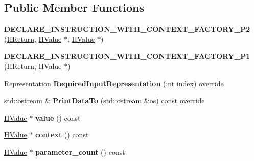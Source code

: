 \subsection*{Public Member Functions}
\begin{DoxyCompactItemize}
\item 
{\bfseries D\+E\+C\+L\+A\+R\+E\+\_\+\+I\+N\+S\+T\+R\+U\+C\+T\+I\+O\+N\+\_\+\+W\+I\+T\+H\+\_\+\+C\+O\+N\+T\+E\+X\+T\+\_\+\+F\+A\+C\+T\+O\+R\+Y\+\_\+\+P2} (\hyperlink{classv8_1_1internal_1_1_h_return}{H\+Return}, \hyperlink{classv8_1_1internal_1_1_h_value}{H\+Value} $\ast$, \hyperlink{classv8_1_1internal_1_1_h_value}{H\+Value} $\ast$)\hypertarget{classv8_1_1internal_1_1_h_return_a0787f2353cdb06f024296ce12d490cdd}{}\label{classv8_1_1internal_1_1_h_return_a0787f2353cdb06f024296ce12d490cdd}

\item 
{\bfseries D\+E\+C\+L\+A\+R\+E\+\_\+\+I\+N\+S\+T\+R\+U\+C\+T\+I\+O\+N\+\_\+\+W\+I\+T\+H\+\_\+\+C\+O\+N\+T\+E\+X\+T\+\_\+\+F\+A\+C\+T\+O\+R\+Y\+\_\+\+P1} (\hyperlink{classv8_1_1internal_1_1_h_return}{H\+Return}, \hyperlink{classv8_1_1internal_1_1_h_value}{H\+Value} $\ast$)\hypertarget{classv8_1_1internal_1_1_h_return_a9df89c1e02c5b2e1d4d44464c4633dcf}{}\label{classv8_1_1internal_1_1_h_return_a9df89c1e02c5b2e1d4d44464c4633dcf}

\item 
\hyperlink{classv8_1_1internal_1_1_representation}{Representation} {\bfseries Required\+Input\+Representation} (int index) override\hypertarget{classv8_1_1internal_1_1_h_return_a665b06af7dc4ff9c04e861908a14ae1f}{}\label{classv8_1_1internal_1_1_h_return_a665b06af7dc4ff9c04e861908a14ae1f}

\item 
std\+::ostream \& {\bfseries Print\+Data\+To} (std\+::ostream \&os) const  override\hypertarget{classv8_1_1internal_1_1_h_return_ab9a1305ae6472826ddbb19a1bbd98e56}{}\label{classv8_1_1internal_1_1_h_return_ab9a1305ae6472826ddbb19a1bbd98e56}

\item 
\hyperlink{classv8_1_1internal_1_1_h_value}{H\+Value} $\ast$ {\bfseries value} () const \hypertarget{classv8_1_1internal_1_1_h_return_a19022461d34f7ab35292f06dca4862f3}{}\label{classv8_1_1internal_1_1_h_return_a19022461d34f7ab35292f06dca4862f3}

\item 
\hyperlink{classv8_1_1internal_1_1_h_value}{H\+Value} $\ast$ {\bfseries context} () const \hypertarget{classv8_1_1internal_1_1_h_return_a95a4a7944de016f0ee58d510882d07e1}{}\label{classv8_1_1internal_1_1_h_return_a95a4a7944de016f0ee58d510882d07e1}

\item 
\hyperlink{classv8_1_1internal_1_1_h_value}{H\+Value} $\ast$ {\bfseries parameter\+\_\+count} () const \hypertarget{classv8_1_1internal_1_1_h_return_a8027053efd31c739018a1e01a360a712}{}\label{classv8_1_1internal_1_1_h_return_a8027053efd31c739018a1e01a360a712}

\end{DoxyCompactItemize}
